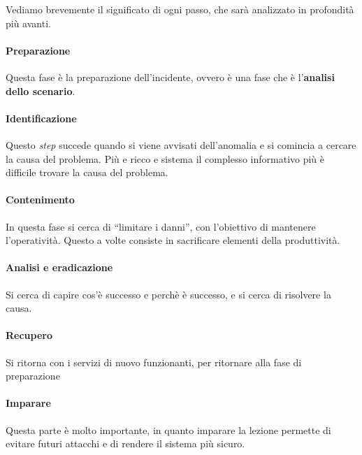 Vediamo brevemente il significato di ogni passo, che sarà analizzato in
profondità più avanti.

\paragraph*{Preparazione} Questa fase è la preparazione dell'incidente, ovvero è
una fase che è l'\textbf{analisi dello scenario}.

\paragraph*{Identificazione} Questo \textit{step} succede quando si viene
avvisati dell'anomalia e si comincia a cercare la causa del problema. Più e
ricco e sistema il complesso informativo più è difficile trovare la causa del
problema.

\paragraph*{Contenimento} In questa fase si cerca di ``limitare i danni'', con
l'obiettivo di mantenere l'operatività. Questo a volte consiste in sacrificare
elementi della produttività.

\paragraph*{Analisi e eradicazione} Si cerca di capire cos'è successo e perchè è
successo, e si cerca di risolvere la causa.

\paragraph*{Recupero} Si ritorna con i servizi di nuovo funzionanti, per
ritornare alla fase di preparazione

\paragraph*{Imparare} Questa parte è molto importante, in quanto imparare la
lezione permette di evitare futuri attacchi e di rendere il sistema più sicuro.
